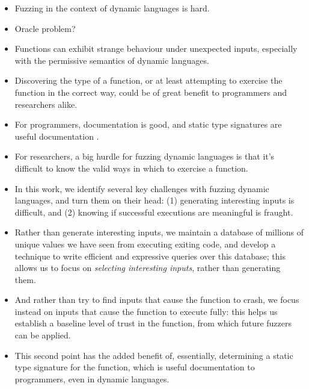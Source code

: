 \begin{itemize}
    \item Fuzzing in the context of dynamic languages is hard.
    \item Oracle problem?
    \item Functions can exhibit strange behaviour under unexpected inputs, especially with the permissive semantics of dynamic languages.
    \item Discovering the type of a function, or at least attempting to exercise the function in the correct way, could be of great benefit to programmers and researchers alike.
    \item For programmers, documentation is good, and static type signatures are useful documentation .
    \item For researchers, a big hurdle for fuzzing dynamic languages is that it's difficult to know the valid ways in which to exercise a function.
    \item In this work, we identify several key challenges with fuzzing dynamic languages, and turn them on their head: (1) generating interesting inputs is difficult, and (2) knowing if successful executions are meaningful is fraught.
    \item Rather than generate interesting inputs, we maintain a database of millions of unique values we have seen from executing exiting code, and develop a technique to write efficient and expressive queries over this database; this allows us to focus on \textit{selecting interesting inputs}, rather than generating them.
    \item And rather than try to find inputs that cause the function to crash, we focus instead on inputs that cause the function to execute fully: this helps us establish a baseline level of trust in the function, from which future fuzzers can be applied. 
    \item This second point has the added benefit of, essentially, determining a static type signature for the function, which is useful documentation to programmers, even in dynamic languages. 
\end{itemize}